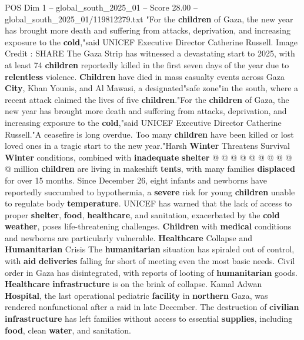 \begin{textsample}{POS Dim 1 – global\_south\_2025\_01 – Score 28.00 – global\_south\_2025\_01/119812279.txt}  \label{ex:f1_pos_296}
"For the \textbf{children} of Gaza, the new year has brought more death and suffering from attacks, deprivation, and increasing exposure to the \textbf{cold},"said UNICEF Executive Director Catherine Russell.
Image Credit : SHARE The Gaza Strip has witnessed a devastating start to 2025, with at least 74 \textbf{children} reportedly killed in the first seven days of the year due to \textbf{relentless} violence. \textbf{Children} have died in mass casualty events across Gaza \textbf{City}, Khan Younis, and Al Mawasi, a designated"safe zone"in the south, where a recent attack claimed the lives of five \textbf{children}."For the \textbf{children} of Gaza, the new year has brought more death and suffering from attacks, deprivation, and increasing exposure to the \textbf{cold},"said UNICEF Executive Director Catherine Russell."A ceasefire is long overdue.
Too many \textbf{children} have been killed or lost loved ones in a tragic start to the new year."Harsh \textbf{Winter} Threatens Survival \textbf{Winter} conditions, combined with \textbf{inadequate} \textbf{shelter} @ @ @ @ @ @ @ @ @ @ million \textbf{children} are living in makeshift \textbf{tents}, with many families \textbf{displaced} for over 15 months.
Since December 26, eight infants and newborns have reportedly succumbed to hypothermia, a \textbf{severe} risk for young \textbf{children} unable to regulate body \textbf{temperature}.
UNICEF has warned that the lack of access to proper \textbf{shelter}, \textbf{food}, \textbf{healthcare}, and sanitation, exacerbated by the \textbf{cold} \textbf{weather}, poses life-threatening challenges. \textbf{Children} with \textbf{medical} conditions and newborns are particularly vulnerable. \textbf{Healthcare} Collapse and \textbf{Humanitarian} Crisis The \textbf{humanitarian} situation has spiraled out of control, with \textbf{aid} \textbf{deliveries} falling far short of meeting even the most basic needs.
Civil order in Gaza has disintegrated, with reports of looting of \textbf{humanitarian} goods. \textbf{Healthcare} \textbf{infrastructure} is on the brink of collapse.
Kamal Adwan \textbf{Hospital}, the last operational pediatric \textbf{facility} in \textbf{northern} Gaza, was rendered nonfunctional after a raid in late December.
The destruction of \textbf{civilian} \textbf{infrastructure} has left families without access to essential \textbf{supplies}, including \textbf{food}, clean \textbf{water}, and sanitation.

\end{textsample}

